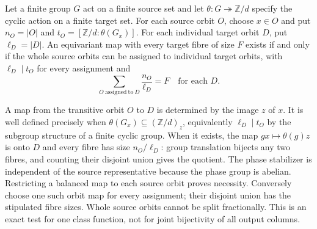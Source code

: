 \begin{proposition}\label{prop:orbit-assignment}
Let a finite group $G$ act on a finite source set and let
$\theta:G\twoheadrightarrow\mathbb Z/d$ specify the cyclic action on a
finite target set. For each source orbit $O$, choose $x\in O$ and put
$n_O=|O|$ and $t_O=[\mathbb Z/d:\theta(G_x)]$.
For each individual target orbit $D$, put $\ell_D=|D|$.
An equivariant map with every target fibre of size $F$ exists if and only
if the whole source orbits can be assigned to individual target orbits,
with $\ell_D\mid t_O$ for every assignment and
\[
 \sum_{O\ \mathrm{assigned\ to}\ D}\frac{n_O}{\ell_D}=F
 \quad\text{for each }D.
\]
\end{proposition}
\begin{outline}
A map from the transitive orbit $O$ to $D$ is determined by the image $z$
of $x$. It is well defined precisely when
$\theta(G_x)\subseteq(\mathbb Z/d)_z$, equivalently
$\ell_D\mid t_O$ by the subgroup structure of a finite cyclic group.
When it exists, the map $gx\mapsto\theta(g)z$ is onto $D$ and every
fibre has size $n_O/\ell_D$: group translation bijects any two fibres,
and counting their disjoint union gives the quotient. The phase
stabilizer is independent of the source representative because the
phase group is abelian. Restricting a balanced map to each source
orbit proves necessity. Conversely choose one such orbit map for every
assignment; their disjoint union has the stipulated fibre sizes.
Whole source orbits cannot be split fractionally. This is an exact test
for one class function, not for joint bijectivity of all output columns.
\end{outline}

